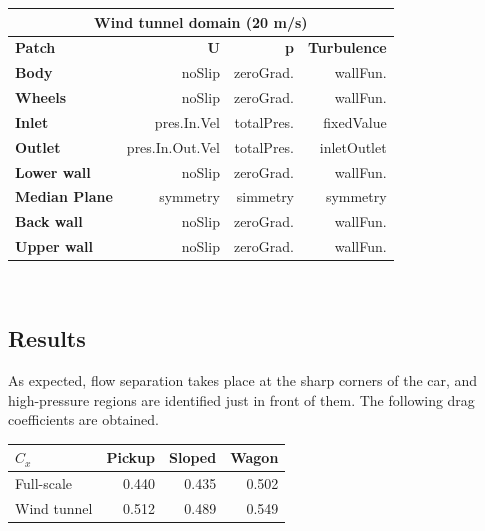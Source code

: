 \documentclass{elbioimp2}
\begin{document}
\begin{tabular}{|l|r|r|r|}
    \hline
    \multicolumn{4}{|c|}{\textbf{Wind tunnel domain (20 m/s)}} \\
    \hline
    \textbf{Patch} & \textbf{U} & \textbf{p} & \textbf{Turbulence} \\
    \hline
    \textbf{Body} & noSlip & zeroGrad. & wallFun. \\
    \textbf{Wheels} & noSlip & zeroGrad. & wallFun. \\
    \textbf{Inlet} & pres.In.Vel & totalPres. & fixedValue \\
    \textbf{Outlet} & pres.In.Out.Vel & totalPres. & inletOutlet \\
    \textbf{Lower wall} & noSlip & zeroGrad. & wallFun. \\
    \textbf{Median Plane} & symmetry & simmetry & symmetry \\
    \textbf{Back wall} & noSlip & zeroGrad. & wallFun. \\
    \textbf{Upper wall} & noSlip & zeroGrad. & wallFun. \\
    \hline
\end{tabular}\\

\subsection{Results}
As expected, flow separation takes place at the sharp corners of the car, and high-pressure regions are identified just in front of them. 
The following drag coefficients are obtained.\\

\begin{tabular}{|l|r|r|r|}
\hline
$C_x$               & Pickup            & Sloped        & Wagon   \\
\hline
Full-scale          & 0.440             & 0.435         & 0.502    \\
Wind tunnel         & 0.512             & 0.489         & 0.549       \\
\hline
\end{tabular}\\
\end{document}
